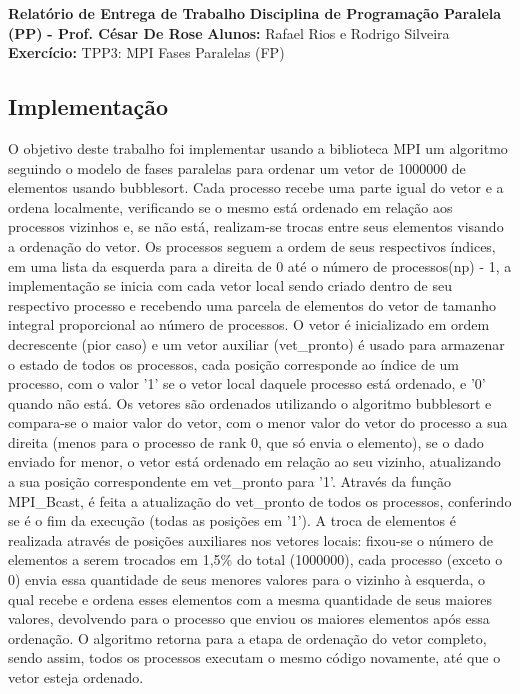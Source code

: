 \documentclass{article}
\begin{document}
\textbf{Relatório de Entrega de Trabalho} \newline
\textbf{Disciplina de Programação Paralela (PP)}\textbf{ - Prof. César De Rose} \newline
\textbf{Alunos:} Rafael Rios e Rodrigo Silveira \newline
\textbf{Exercício:} TPP3: MPI Fases Paralelas (FP)

\begin{multicols*}{2}

\section{Implementação}
O objetivo deste trabalho foi implementar usando a biblioteca MPI um algoritmo seguindo o modelo de fases paralelas para ordenar um vetor de 1000000 de elementos usando bubblesort. Cada processo recebe uma parte igual do vetor e a ordena localmente, verificando se o mesmo está ordenado em relação aos processos vizinhos e, se não está, realizam-se trocas entre seus elementos visando a ordenação do vetor. Os processos seguem a ordem de seus respectivos índices, em uma lista da esquerda para a direita de 0 até o número de processos(np) - 1, a implementação se inicia com cada vetor local sendo criado dentro de seu respectivo processo e recebendo uma parcela de elementos do vetor de tamanho integral proporcional ao número de processos. O vetor é inicializado em ordem decrescente (pior caso) e um vetor auxiliar (vet\_pronto) é usado para armazenar o estado de todos os processos, cada posição corresponde ao índice de um processo, com o valor '1' se o vetor local daquele processo está ordenado, e '0' quando não está. Os vetores são ordenados utilizando o algoritmo bubblesort e compara-se o maior valor do vetor, com o menor valor do vetor do processo a sua direita (menos para o processo de rank 0, que só envia o elemento), se o dado enviado for menor, o vetor está ordenado em relação ao seu vizinho, atualizando a sua posição correspondente em  vet\_pronto para '1'. Através da função MPI\_Bcast, é feita a atualização do vet\_pronto de todos os processos, conferindo se é o fim da execução (todas as posições em '1'). A troca de elementos é realizada através de posições auxiliares nos vetores locais: fixou-se o número de elementos a serem trocados em 1,5\% do total (1000000), cada processo (exceto o 0) envia essa quantidade de seus menores valores para o vizinho à esquerda, o qual recebe e ordena esses elementos com a mesma quantidade de seus maiores valores, devolvendo para o processo que enviou os maiores elementos após essa ordenação. O algoritmo retorna para a etapa de ordenação do vetor completo, sendo assim, todos os processos executam o mesmo código novamente, até que o vetor esteja ordenado.

\end{multicols*}
\end{document}
